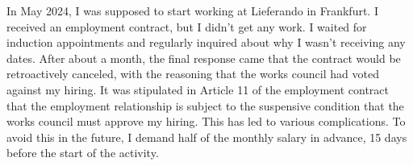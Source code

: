 \versionLanguageStart%
		In May 2024, I was supposed to start working at Lieferando in Frankfurt.
		I received an employment contract, but I didn't get any work.
		I waited for induction appointments and regularly inquired about why I wasn't receiving any dates.
		After about a month, the final response came that the contract would be retroactively canceled, with the reasoning that the works council had voted against my hiring.
		It was stipulated in Article 11 of the employment contract that the employment relationship is subject to the suspensive condition that the works council must approve my hiring.
		This has led to various complications.
		To avoid this in the future, I demand half of the monthly salary in advance, 15 days before the start of the activity.
\versionLanguageEnd